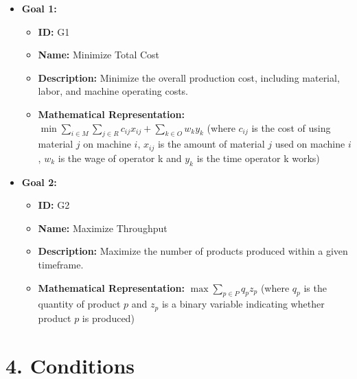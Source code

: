 \documentclass{article}
\begin{document}
\begin{itemize}
    \item \textbf{Goal 1:}
        \begin{itemize}
            \item \textbf{ID:} G1
            \item \textbf{Name:} Minimize Total Cost
            \item \textbf{Description:} Minimize the overall production cost, including material, labor, and machine operating costs.
            \item \textbf{Mathematical Representation:}  $\min \sum_{i \in M} \sum_{j \in R} c_{ij}x_{ij} + \sum_{k \in O} w_k y_k$  (where $c_{ij}$ is the cost of using material $j$ on machine $i$, $x_{ij}$ is the amount of material $j$ used on machine $i$, $w_k$ is the wage of operator k and $y_k$ is the time operator k works)
        \end{itemize}
    \item \textbf{Goal 2:}
        \begin{itemize}
            \item \textbf{ID:} G2
            \item \textbf{Name:} Maximize Throughput
            \item \textbf{Description:} Maximize the number of products produced within a given timeframe.
            \item \textbf{Mathematical Representation:} $\max \sum_{p \in P} q_p z_p$ (where $q_p$ is the quantity of product $p$ and $z_p$ is a binary variable indicating whether product $p$ is produced)
        \end{itemize}
\end{itemize}

\section{4. Conditions}
\end{document}
